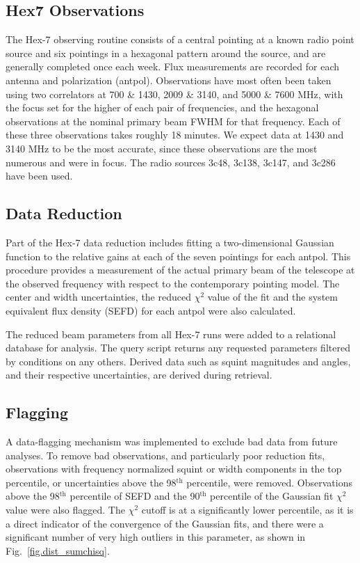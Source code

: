 \documentclass[preprint]{aastex}
\begin{document}
\subsection{Hex7 Observations}\label{ss.observations}
The Hex-7 observing routine consists of a central pointing at a known
radio point source and six pointings in a hexagonal pattern around the
source, and are generally completed once each week.  Flux measurements
are recorded for each antenna and polarization (antpol). Observations
have most often been taken using two correlators at 700 \& 1430, 2009
\& 3140, and 5000 \& 7600 MHz, with the focus set for the higher of
each pair of frequencies, and the hexagonal observations at the
nominal primary beam FWHM for that frequency.  Each of these three
observations takes roughly 18 minutes. We expect data at 1430 and 3140
MHz to be the most accurate, since these observations are the most
numerous and were in focus. The radio sources 3c48, 3c138, 3c147, and
3c286 have been used.

\subsection{Data Reduction}\label{ss.reduction}
Part of the Hex-7 data reduction includes fitting a two-dimensional
Gaussian function to the relative gains at each of the seven pointings
for each antpol.  This procedure provides a measurement of the actual
primary beam of the telescope at the observed frequency with respect
to the contemporary pointing model.  The center and width
uncertainties, the reduced $\chi^2$ value of the fit and the system
equivalent flux density (SEFD) for each antpol were also calculated.

The reduced beam parameters from all Hex-7 runs were added to a
relational database for analysis.  The query script returns any
requested parameters filtered by conditions on any others.  Derived
data such as squint magnitudes and angles, and their respective
uncertainties, are derived during retrieval.

\subsection{Flagging}\label{ss.flagging}
A data-flagging mechanism was implemented to exclude bad data from
future analyses.  To remove bad observations, and particularly poor
reduction fits, observations with frequency normalized squint or width
components in the top percentile, or uncertainties above the
98$^\textrm{th}$ percentile, were removed.  Observations above the
98$^\textrm{th}$ percentile of SEFD and the 90$^\textrm{th}$
percentile of the Gaussian fit $\chi^2$ value were also flagged.  The
$\chi^2$ cutoff is at a significantly lower percentile, as it is a
direct indicator of the convergence of the Gaussian fits, and there
were a significant number of very high outliers in this parameter, as
shown in Fig.~\ref{fig.dist_sumchisq}.
\end{document}
